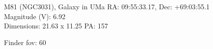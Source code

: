 \begin{block}{M81 (NGC3031), Galaxy in UMa}
    RA: 09:55:33.17, Dec: +69:03:55.1 \\ 
    Magnitude (V): 6.92 \\ 
    Dimensions: 21.63 x 11.25 PA: 157 

    Finder fov: 60 
\end{block}